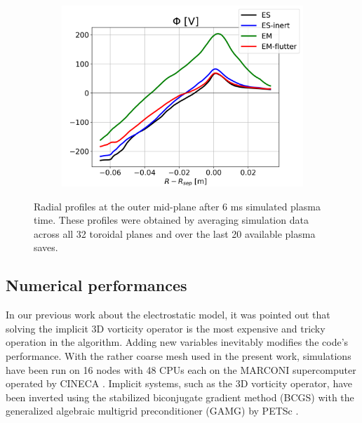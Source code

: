 \begin{figure}[H]
\begin{subfigure}[t]{0.30\textwidth}
		\includegraphics[width=1\textwidth]{schemes/OMP_profiles_global_fields_PHI.png}
	\end{subfigure}
	\caption{Radial profiles at the outer mid-plane after 6 ms simulated plasma time. These profiles were obtained by averaging simulation data across all 32 toroidal planes and over the last 20 available plasma saves.}
	\label{fig:OMP_profiles}
\end{figure}



\subsection{Numerical performances}
\label{performances}

In our previous work \cite{tamain2016tokam3x, Bufferand2021} about the electrostatic model, it was pointed out that solving the implicit 3D vorticity operator is the most expensive and tricky operation in the algorithm. Adding new variables inevitably modifies the code's performance. With the rather coarse mesh used in the present work, simulations have been run on 16 nodes with 48 CPUs each on the MARCONI supercomputer operated by CINECA \cite{iannone2018marconi-fusion}. Implicit systems, such as the 3D vorticity operator, have been inverted using the stabilized biconjugate gradient method (BCGS) \cite{vandervorst1992bicgstab} with the generalized algebraic multigrid preconditioner (GAMG) by PETSc \cite{petsc-web-page}. \newline


